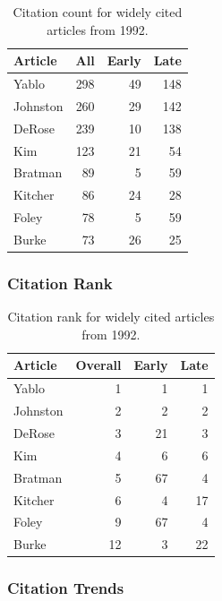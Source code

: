 \documentclass[
  10pt,
  letterpaper,
  DIV=11,
  numbers=noendperiod,
  twoside]{scrartcl}
\begin{document}
\begin{longtable}[]{@{}lrrr@{}}

\caption{\label{tbl-citation-count-1992}Citation count for widely cited
articles from 1992.}

\tabularnewline

\toprule\noalign{}
Article & All & Early & Late \\
\midrule\noalign{}
\endhead
\bottomrule\noalign{}
\endlastfoot
Yablo & 298 & 49 & 148 \\
Johnston & 260 & 29 & 142 \\
DeRose & 239 & 10 & 138 \\
Kim & 123 & 21 & 54 \\
Bratman & 89 & 5 & 59 \\
Kitcher & 86 & 24 & 28 \\
Foley & 78 & 5 & 59 \\
Burke & 73 & 26 & 25 \\

\end{longtable}

\subsubsection*{Citation Rank}\label{sec-rank-1992}

\begin{longtable}[]{@{}lrrr@{}}

\caption{\label{tbl-citation-rank-1992}Citation rank for widely cited
articles from 1992.}

\tabularnewline

\toprule\noalign{}
Article & Overall & Early & Late \\
\midrule\noalign{}
\endhead
\bottomrule\noalign{}
\endlastfoot
Yablo & 1 & 1 & 1 \\
Johnston & 2 & 2 & 2 \\
DeRose & 3 & 21 & 3 \\
Kim & 4 & 6 & 6 \\
Bratman & 5 & 67 & 4 \\
Kitcher & 6 & 4 & 17 \\
Foley & 9 & 67 & 4 \\
Burke & 12 & 3 & 22 \\

\end{longtable}

\subsubsection*{Citation Trends}\label{sec-trends-1992}
\end{document}
